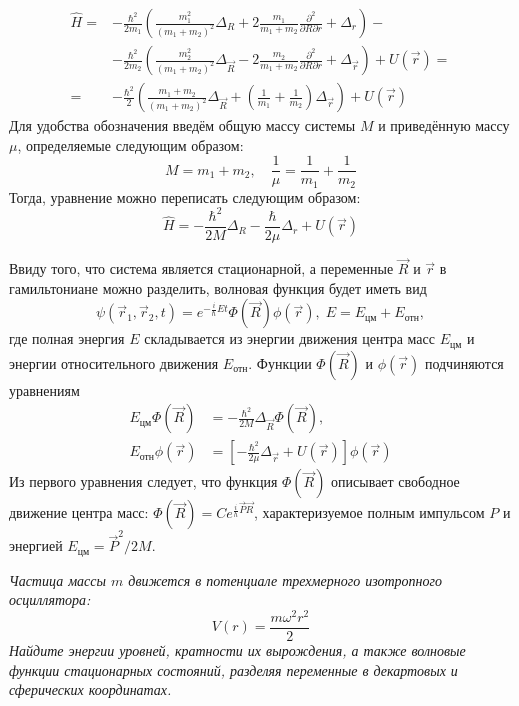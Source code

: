 \begin{align*}
    \hat{H} = &-\frac{\hbar^2}{2m_1}\left(\frac{m_1^2}{(m_1 + m_2)^2}\Delta_{R} + 2\frac{m_1}{m_1 + m_2}\frac{\partial^2}{\partial R \partial r} + \Delta_{r}\right) - \\
    & -\frac{\hbar^2}{2m_2}\left(\frac{m_2^2}{(m_1 + m_2)^2} \Delta_{\Vec{R}} - 2\frac{m_2}{m_1 + m_2} \frac{\partial^2}{\partial R \partial r} + \Delta_{\Vec{r}}\right) + U(\Vec{r}) = \\
     = & -\frac{\hbar^2}{2}\left(\frac{m_1 + m_2}{(m_1 + m_2)^2}\Delta_{\Vec{R}} + \left(\frac{1}{m_1} + \frac{1}{m_2}\right)\Delta_{\Vec{r}}\right) + U(\Vec{r})
\end{align*}
Для удобства обозначения введём общую массу системы $M$ и приведённую массу $\mu$, определяемые следующим образом:
\[
M = m_1 + m_2, \quad \frac{1}{\mu} = \frac{1}{m_1} + \frac{1}{m_2}
\]
Тогда, уравнение можно переписать следующим образом:
\[
\hat{H} = -\frac{\hbar^2}{2M}\Delta_{R} - \frac{\hbar}{2\mu}\Delta_{r} + U(\Vec{r})
\]

Ввиду того, что система является стационарной, а переменные $\Vec{R}$ и $\Vec{r}$ в гамильтониане можно разделить, волновая функция будет иметь вид
\[
\psi(\Vec{r}_1, \Vec{r}_2, t) = e^{-\frac{i}{\hbar}Et}\Phi(\Vec{R})\phi(\Vec{r}), \; E = E_{\text{цм}} + E_{\text{отн}},
\]
где полная энергия $E$ складывается из энергии движения центра масс $E_{\text{цм}}$ и энергии относительного движения $E_{\text{отн}}$. Функции $\Phi(\Vec{R})$ и $\phi(\Vec{r})$ подчиняются уравнениям
\begin{align*}
      E_{\text{цм}}\Phi(\Vec{R}) &=-\frac{\hbar^2}{2M}\Delta_{\Vec{R}}\Phi(\Vec{R}), \\
     E_{\text{отн}}\phi(\Vec{r}) &= \left[-\frac{\hbar^2}{2\mu}\Delta_{\Vec{r}} + U(\Vec{r})\right]\phi(\Vec{r})
\end{align*}
Из первого уравнения следует, что функция $\Phi(\Vec{R})$ описывает свободное движение центра масс: $\Phi(\Vec{R}) = Ce^{\frac{i}{h}\Vec{P}\Vec{R}}$, характеризуемое полным импульсом $P$ и энергией $E_{\text{цм}} = \Vec{P}^2/2M$.

\begin{center}
    \textit{Частица массы $m$ движется в потенциале трехмерного изотропного осциллятора:}
    \[
    V(r) = \frac{m\omega^2r^2}{2}
    \]
    \textit{Найдите энергии уровней, кратности их вырождения, а также волновые функции стационарных состояний, разделяя переменные в декартовых и сферических координатах.}
\end{center}

